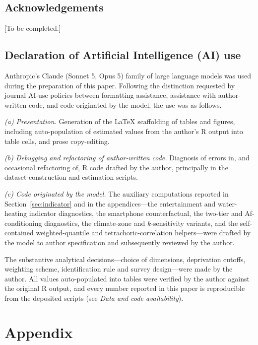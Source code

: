 \documentclass[11pt, a4paper]{article}
\begin{document}
\subsection*{Acknowledgements}

[To be completed.]

\subsection*{Declaration of Artificial Intelligence (AI) use}

Anthropic's Claude (Sonnet 5, Opus 5) family of large language models was used during the preparation of this paper. Following the distinction requested by journal AI-use policies between formatting assistance, assistance with author-written code, and code originated by the model, the use was as follows.

\emph{(a) Presentation.} Generation of the \LaTeX{} scaffolding of tables and figures, including auto-population of estimated values from the author's R output into table cells, and prose copy-editing.

\emph{(b) Debugging and refactoring of author-written code.} Diagnosis of errors in, and occasional refactoring of, R code drafted by the author, principally in the dataset-construction and estimation scripts.

\emph{(c) Code originated by the model.} The auxiliary computations reported in Section~\ref{sec:indicator} and in the appendices---the entertainment and water-heating indicator diagnostics, the smartphone counterfactual, the two-tier and Af-conditioning diagnostics, the climate-zone and $k$-sensitivity variants, and the self-contained weighted-quantile and tetrachoric-correlation helpers---were drafted by the model to author specification and subsequently reviewed by the author.

The substantive analytical decisions---choice of dimensions, deprivation cutoffs, weighting scheme, identification rule and survey design---were made by the author. All values auto-populated into tables were verified by the author against the original R output, and every number reported in this paper is reproducible from the deposited scripts (see \emph{Data and code availability}).

\FloatBarrier 
\newpage
\appendix
\section*{Appendix}
\setcounter{table}{0}
\setcounter{figure}{0}
\end{document}
